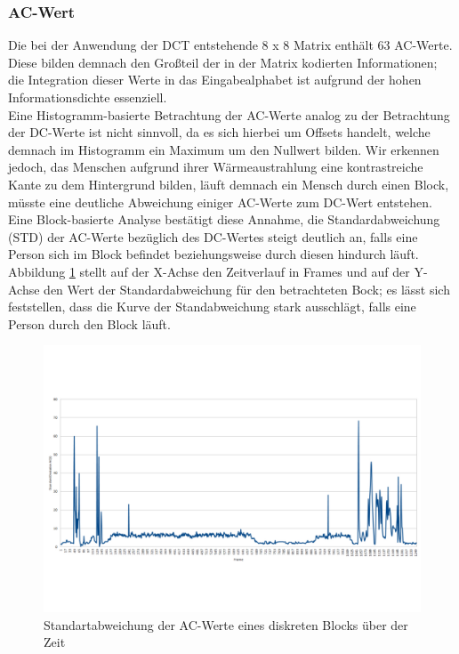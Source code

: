 \subsubsection{AC-Wert}
\label{sec:ac-wert}

Die bei der Anwendung der DCT entstehende 8 x 8 Matrix enthält 63 AC-Werte. Diese bilden demnach den Großteil der in der Matrix kodierten Informationen; die Integration dieser Werte in das Eingabealphabet ist aufgrund der hohen Informationsdichte essenziell.\\
Eine Histogramm-basierte Betrachtung der AC-Werte analog zu der Betrachtung der DC-Werte ist nicht sinnvoll, da es sich hierbei um Offsets handelt, welche demnach im Histogramm ein Maximum um den Nullwert bilden.
Wir erkennen jedoch, das Menschen aufgrund ihrer Wärmeaustrahlung eine kontrastreiche Kante zu dem Hintergrund bilden, läuft demnach ein Mensch durch einen Block, müsste eine deutliche Abweichung einiger AC-Werte zum DC-Wert entstehen.
Eine Block-basierte Analyse bestätigt diese Annahme, die Standardabweichung (STD) der AC-Werte bezüglich des DC-Wertes steigt deutlich an, falls eine Person sich im Block befindet beziehungsweise durch diesen hindurch läuft.\\
Abbildung \ref{fig:ac_over_time} stellt auf der X-Achse den Zeitverlauf in Frames und auf der Y-Achse den Wert der Standardabweichung für den betrachteten Bock; es lässt sich feststellen, dass die Kurve der Standabweichung stark ausschlägt, falls eine Person durch den Block läuft.\\
\begin{figure}[H]
	\centering
	\includegraphics[trim=0cm 4.0cm 0cm 4cm, clip=true,width=1\textwidth]{bilder/05_AC_over_time.pdf}
	\caption{Standartabweichung der AC-Werte eines diskreten Blocks über der Zeit}
	\label{fig:ac_over_time}
\end{figure}

